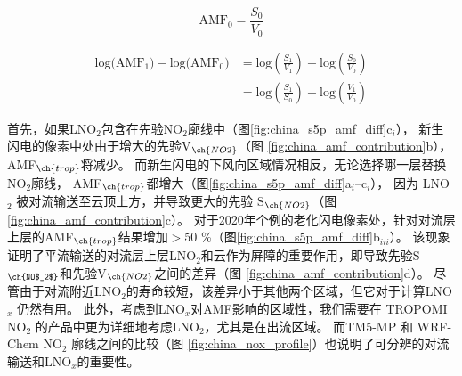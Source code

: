 \begin{equation} \label{eq:AMF0}
\textrm{AMF}_0 = \frac{S_0}{V_0}
\end{equation}


\begin{equation} \label{eq:delta_AMF}
\begin{split}
\textrm{log(AMF$_1$)} - \textrm{log(AMF$_0$)} & = \textrm{log}(\frac{S_1}{V_1}) - \textrm{log}(\frac{S_0}{V_0}) \\
                                              & = \textrm{log}(\frac{S_1}{S_0}) - \textrm{log}(\frac{V_1}{V_0})
\end{split}
\end{equation}


首先，如果LNO$_2$包含在先验NO$_2$廓线中（图\ref{fig:china_s5p_amf_diff}c$_i$），
新生闪电的像素中处由于增大的先验V$_{\ch{NO2}}$（图 \ref{fig:china_amf_contribution}b），AMF$_{\ch{trop}}$将减少。
而新生闪电的下风向区域情况相反，无论选择哪一层替换NO$_2$廓线，
AMF$_{\ch{trop}}$都增大（图\ref{fig:china_s5p_amf_diff}a$_{i}$--c$_{i}$），
因为 LNO $_2$ 被对流输送至云顶上方，并导致更大的先验 S$_{\ch{NO2}}$（图 \ref{fig:china_amf_contribution}c）。
对于2020年个例的老化闪电像素处，针对对流层上层的AMF$_{\ch{trop}}$结果增加$>$50 \%（图\ref{fig:china_s5p_amf_diff}b$_{iii}$）。
该现象证明了平流输送的对流层上层LNO$_2$和云作为屏障的重要作用，即导致先验S$_{\ch{NO$_2$}}$和先验V$_{\ch{NO2}}$之间的差异（图 \ref{fig:china_amf_contribution}d）。
尽管由于对流附近LNO$_2$的寿命较短，该差异小于其他两个区域，但它对于计算LNO$_x$ 仍然有用。
此外，考虑到LNO$_x$对AMF影响的区域性，我们需要在 TROPOMI NO$_2$ 的产品中更为详细地考虑LNO$_2$，尤其是在出流区域。
而TM5-MP 和 WRF-Chem NO$_2$ 廓线之间的比较（图 \ref{fig:china_nox_profile}）也说明了可分辨的对流输送和LNO$_x$的重要性。



